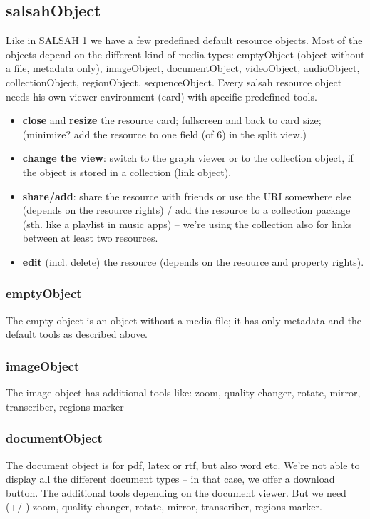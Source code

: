 \newpage
\subsection{salsahObject}

Like in SALSAH 1 we have a few predefined default resource objects. Most of the objects depend on the different kind of media types: emptyObject (object without a file, metadata only), imageObject, documentObject, videoObject, audioObject, collectionObject, regionObject, sequenceObject. Every salsah resource object needs his own viewer environment (card) with specific predefined tools.

\begin{itemize}
	\item \textbf{close} and \textbf{resize} the resource card; fullscreen and back to card size; (minimize? add the resource to one field (of 6) in the split view.)
	\item \textbf{change the view}: switch to the graph viewer or to the collection object, if the object is stored in a collection (link object).
	\item \textbf{share/add}: share the resource with friends or use the URI somewhere else (depends on the resource rights) / add the resource to a collection package (sth. like a playlist in music apps) -- we're using the collection also for links between at least two resources.
	\item \textbf{edit} (incl. delete) the resource (depends on the resource and property rights).
\end{itemize}


\subsubsection{emptyObject}
The empty object is an object without a media file; it has only metadata and the default tools as described above.

\subsubsection{imageObject}
The image object has additional tools like:
zoom, quality changer, rotate, mirror, transcriber, regions marker

\subsubsection{documentObject}
The document object is for pdf, latex or rtf, but also word etc. We're not able to display all the different document types -- in that case, we offer a download button.
The additional tools depending on the document viewer. But we need (+/-) zoom, quality changer, rotate, mirror, transcriber, regions marker.

